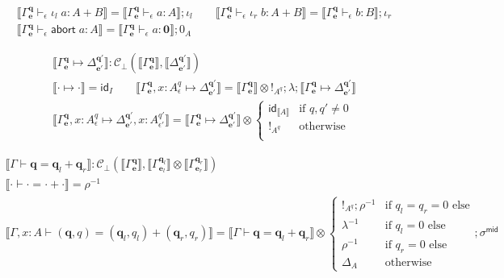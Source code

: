\documentclass[acmsmall,screen,review]{acmart}
\newcommand{\mc}[1]{\ensuremath{\mathcal{#1}}}
\newcommand{\mb}[1]{\ensuremath{\mathbf{#1}}}
\newcommand{\ms}[1]{\ensuremath{\mathsf{#1}}}
\newcommand{\linl}[1]{\iota_l\;{#1}}
\newcommand{\linr}[1]{\iota_r\;{#1}}
\newcommand{\labort}[1]{\ms{abort}\;{#1}}
\newcommand{\qsp}[4]{#1 \vdash #2 = #3 + #4}
\newcommand{\cwk}[2]{#1 \mapsto #2}
\newcommand{\hasty}[4]{#1 \vdash_{#2} #3: {#4}}
\newcommand{\dnt}[1]{\llbracket{#1}\rrbracket}
\begin{document}
\begin{gather*}
  \dnt{\hasty{\Gamma^{\mb{q}}_{\mb{e}}}{\epsilon}{\linl{a}}{A + B}}
  = \dnt{\hasty{\Gamma^{\mb{q}}_{\mb{e}}}{\epsilon}{a}{A}} ; \iota_l \qquad
  \dnt{\hasty{\Gamma^{\mb{q}}_{\mb{e}}}{\epsilon}{\linr{b}}{A + B}}
  = \dnt{\hasty{\Gamma^{\mb{q}}_{\mb{e}}}{\epsilon}{b}{B}} ; \iota_r \\
  \dnt{\hasty{\Gamma^{\mb{q}}_{\mb{e}}}{\epsilon}{\labort{a}}{A}}
  = \dnt{\hasty{\Gamma^{\mb{q}}_{\mb{e}}}{\epsilon}{a}{\mb{0}}} ; 0_A
\end{gather*}

\begin{gather*}
  \boxed{\dnt{\cwk{\Gamma^{\mb{q}}_{\mb{e}}}{\Delta^{\mb{q}'}_{\mb{e}'}}} 
    : \mc{C}_\bot(\dnt{\Gamma^{\mb{q}}_{\mb{e}}}, \dnt{\Delta^{\mb{q}'}_{\mb{e}'}})} \\
  \dnt{\cwk{\cdot}{\cdot}} = \ms{id}_I \qquad
  \dnt{\cwk{\Gamma^{\mb{q}}_{\mb{e}}, x : A^q_\epsilon}{\Delta^{\mb{q}'}_{\mb{e}'}}}
    = \dnt{\Gamma^{\mb{q}}_{\mb{e}}} \otimes !_{A^q}
    ; \lambda
    ; \dnt{\cwk{\Gamma^{\mb{q}}_{\mb{e}}}{\Delta^{\mb{q}'}_{\mb{e}'}}} \\
  \dnt{\cwk{\Gamma^{\mb{q}}_{\mb{e}}, x : A^q_\epsilon}
            {\Delta^{\mb{q}'}_{\mb{e}'}, x : A^{q'}_{\epsilon'}}}
    = \dnt{\cwk{\Gamma^{\mb{q}}_{\mb{e}}}{\Delta^{\mb{q}'}_{\mb{e}'}}} \otimes \begin{cases}
      \ms{id}_{\dnt{A}} & \text{if } q, q' \neq 0 \\
      !_{A^q} & \text{otherwise} \\
    \end{cases}
\end{gather*}

\begin{gather*}
  \boxed{\dnt{\qsp{\Gamma}{\mb{q}}{\mb{q}_l}{\mb{q}_r}} 
    : \mc{C}_\bot(\dnt{\Gamma^{\mb{q}}_{\mb{e}}}, 
      \dnt{\Gamma^{\mb{q}_l}_{\mb{e}_l}} \otimes \dnt{\Gamma^{\mb{q}_r}_{\mb{e}_r}})} 
  \\
  \dnt{\qsp{\cdot}{\cdot}{\cdot}{\cdot}} = \rho^{-1}
  \\
  \dnt{\qsp{\Gamma, x : A}{(\mb{q}, q)}{(\mb{q}_l, q_l)}{(\mb{q}_r, q_r)}}
  = \dnt{\qsp{\Gamma}{\mb{q}}{\mb{q}_l}{\mb{q}_r}} \otimes
  \begin{cases}
    !_{A^q} ; \rho^{-1} & \text{if } q_l = q_r = 0 \text{ else} \\
    \lambda^{-1} & \text{if } q_l = 0 \text{ else} \\
    \rho^{-1} & \text{if } q_r = 0 \text{ else} \\
    \Delta_A & \text{otherwise}
  \end{cases} ; \sigma^{\ms{mid}}
\end{gather*}
\end{document}
